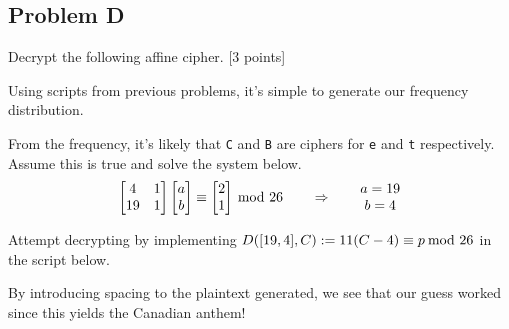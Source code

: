 \documentclass[../hw_sols.tex]{subfiles}
\begin{document}
\newpage



\subsection*{Problem D}

Decrypt the following affine cipher. [3 points]


\begin{solution}

Using scripts from previous problems, it's simple to generate our frequency 
distribution.


From the frequency, it's likely that \verb|C| and \verb|B| are ciphers for 
\verb|e| and \verb|t| respectively. Assume this is true and solve the system 
below.
	$$\begin{bmatrix} 4 & 1 \\ 19 & 1 \end{bmatrix}
	\begin{bmatrix} a \\ b \end{bmatrix}
	\equiv
	\begin{bmatrix} 2 \\ 1 \end{bmatrix}
	\tmod{26} 
	\qquad \Rightarrow \qquad
	\begin{matrix} a = 19 \\ b = 4 \end{matrix}$$

Attempt decrypting by implementing 
$D([19,4],C) := 11(C-4) \equiv p \tmod{26}$ in the script below.



By introducing spacing to the plaintext generated, we see that our guess 
worked since this yields the Canadian anthem!


\end{solution}
\end{document}
